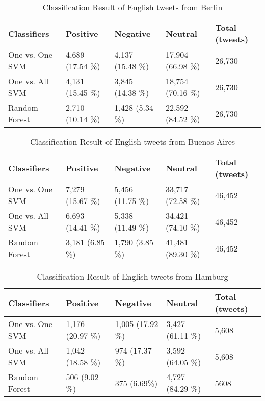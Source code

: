 \begin{table}[ht]
	\caption{Classification Result of English tweets from Berlin}
	\begin{tabular}{|l|p{1.8cm}|p{1.8cm}|p{1.8cm}|p{1.8cm}|} \hline
	Classifiers & Positive & Negative & Neutral & Total (tweets)\\ \hline
One vs. One SVM & 4,689 (17.54 \%) & 4,137 (15.48 \%)  & 17,904 (66.98 \%)& 26,730 \\ \hline
One vs. All SVM & 4,131 (15.45 \%) & 3,845 (14.38 \%) & 18,754 (70.16 \%) & 26,730 \\ \hline
Random Forest   & 2,710 (10.14 \%) & 1,428 \newline(5.34 \%) & 22,592 (84.52 \%) & 26,730 \\ \hline
	\end{tabular}
	\label{tab:result_berlin_en}
\end{table}


\begin{table}[ht]
	\caption{Classification Result of English tweets from Buenos Aires}
	\begin{tabular}{|l|p{1.8cm}|p{1.8cm}|p{1.8cm}|p{1.8cm}|} \hline
	Classifiers & Positive & Negative & Neutral & Total (tweets)\\ \hline
One vs. One SVM & 7,279 (15.67 \%) & 5,456 (11.75 \%) & 33,717 (72.58 \%) & 46,452 \\ \hline
One vs. All SVM & 6,693 (14.41 \%) & 5,338 (11.49 \%) & 34,421 (74.10 \%) & 46,452 \\\hline
Random Forest   & 3,181 \newline(6.85 \%) & 1,790 \newline(3.85 \%) & 41,481 (89.30 \%) & 46,452 \\\hline
	\end{tabular}
	\label{tab:result_buenosaires_en}
\end{table}



\begin{table}[ht]
	\caption{Classification Result of English tweets from Hamburg}
	\begin{tabular}{|l|p{1.8cm}|p{1.8cm}|p{1.8cm}|p{1.8cm}|} \hline
	Classifiers & Positive & Negative & Neutral & Total (tweets)\\ \hline
One vs. One SVM & 1,176 (20.97 \%) & 1,005 (17.92 \%) & 3,427 (61.11 \%) & 5,608 \\\hline
One vs. All SVM & 1,042 (18.58 \%) & 974 \newline(17.37 \%) & 3,592 (64.05 \%) & 5,608 \\\hline
Random Forest   & 506 \newline(9.02 \%)  & 375 (6.69\%) & 4,727 (84.29 \%) & 5608 \\\hline
	\end{tabular}
	\label{tab:result_hamburg_en}
\end{table}

